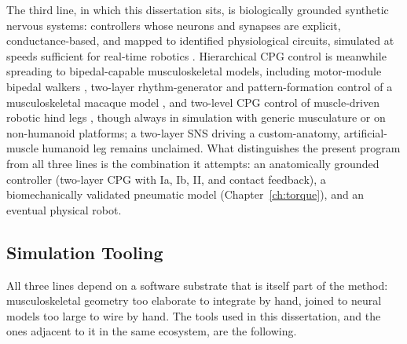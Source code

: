 The third line, in which this dissertation sits, is biologically grounded synthetic nervous systems: controllers whose neurons and synapses are explicit, conductance-based, and mapped to identified physiological circuits, simulated at speeds sufficient for real-time robotics \citep{nourse_sns_2023}. Hierarchical CPG control is meanwhile spreading to bipedal-capable musculoskeletal models, including motor-module bipedal walkers \citep{ichimura_pathological_2019}, two-layer rhythm-generator and pattern-formation control of a musculoskeletal macaque model \citep{nishizaki_gait_2026}, and two-level CPG control of muscle-driven robotic hind legs \citep{fukuoka_autonomous_2021}, though always in simulation with generic musculature or on non-humanoid platforms; a two-layer SNS driving a custom-anatomy, artificial-muscle humanoid leg remains unclaimed. What distinguishes the present program from all three lines is the combination it attempts: an anatomically grounded controller (two-layer CPG with Ia, Ib, II, and contact feedback), a biomechanically validated pneumatic model (Chapter~\ref{ch:torque}), and an eventual physical robot.

\subsection{Simulation Tooling}\label{sec:bg_tools}

All three lines depend on a software substrate that is itself part of the method: musculoskeletal geometry too elaborate to integrate by hand, joined to neural models too large to wire by hand. The tools used in this dissertation, and the ones adjacent to it in the same ecosystem, are the following.

